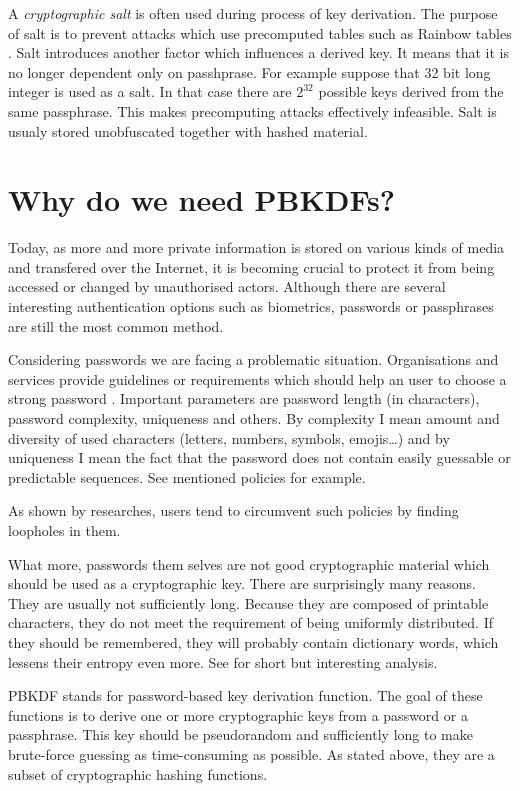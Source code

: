 \documentclass[nolof]{fithesis3}
\begin{document}
A \emph{cryptographic salt} is often used during process of key derivation. The purpose of salt is to prevent attacks which use precomputed tables such as Rainbow tables \parencite{rainbowtables}. Salt introduces another factor which influences a derived key. It means that it is no longer dependent only on passhprase. For example suppose that 32 bit long integer is used as a salt. In that case there are \(2^{32}\) possible keys derived from the same passphrase. This makes precomputing attacks effectively infeasible. Salt is usualy stored unobfuscated together with hashed material.

\section{Why do we need PBKDFs?}
\label{whypbkdfs}
Today, as more and more private information is stored on various kinds of media and transfered over the Internet, it is becoming crucial to protect it from being accessed or changed by unauthorised actors. Although there are several interesting authentication options such as biometrics, passwords or passphrases are still the most common method.

Considering passwords we are facing a problematic situation. Organisations and services provide guidelines or requirements which should help an user to choose a strong password \parencite{nistpasswords} \parencite{sanspasswordguidelines}. Important parameters are password length (in characters), password complexity, uniqueness and others. By complexity I mean amount and diversity of used characters (letters, numbers, symbols, emojis\dots) and by uniqueness I mean the fact that the password does not contain easily guessable or predictable sequences. See mentioned policies for example.

As shown by researches, users tend to circumvent such policies by finding loopholes in them. %

What more, passwords them selves are not good cryptographic material which should be used as a cryptographic key. There are surprisingly many reasons. They are usually not sufficiently long. Because they are composed of printable characters, they do not meet the requirement of being uniformly distributed. If they should be remembered, they will probably contain dictionary words, which lessens their entropy even more. See \parencite[section 5.6.4]{itmc14} for short but interesting analysis.

PBKDF stands for password-based key derivation function. The goal of these functions is to derive one or more cryptographic keys from a password or a passphrase. This key should be pseudorandom and sufficiently long to make brute-force guessing as time-consuming as possible. As stated above, they are a subset of cryptographic hashing functions.
\end{document}
